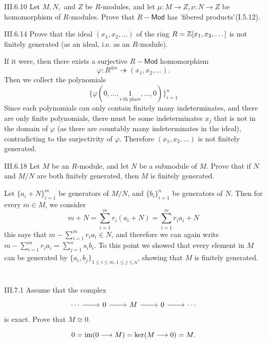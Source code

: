 \begin{problem}{III.6.10}
Let $M,N,$ and $Z$ be $R$-modules, and let $\mu:M \to Z, \nu:N \to Z$ be homomorphism of $R$-modules. Prove that $R-\mathsf{Mod}$ has 'fibered products'(I.5.12).
\end{problem}

\begin{problem}{III.6.14}
Prove that the ideal $(x_1,x_2,\dotsc)$ of the ring $R = \mathbb{Z}[x_1,x_2,\dotsc]$ is not finitely generated (as an ideal, i.e. as an $R$-module).
\end{problem}
\begin{pf}
If it were, then there exists a surjective $R-\mathsf{Mod}$ homomorphism
\[
\varphi : R^{\oplus n} \twoheadrightarrow (x_1,x_2,\dotsc).
\]
Then we collect the polynomials 
\[
\{\varphi(0,\dotsc,\underset{i\text{-th place}}{1},\dotsc,0)\}_{i = 1}^n	
\]
Since each polynomials can only contain finitely many indeterminates, and there are only finite polynomials, there must be some indeterminates $x_j$ that is not in the domain of $\varphi$ (as there are countably many indeterminates in the ideal), contradicting to the surjectivity of $\varphi$. Therefore $(x_1,x_2,\dotsc)$ is not finitely generated.
\end{pf}

\begin{problem}{III.6.18}
Let $M$ be an $R$-module, and let $N$ be a submodule of $M$. Prove that if $N$ and $M/N$ are both finitely generated, then $M$ is finitely generated.
\end{problem}
\begin{pf}
Let $\{a_i + N\}_{i = 1}^m$ be generators of $M/N$, and $\{b_i\}_{i = 1}^n$ be generators of $N$. Then for every $m \in M$, we consider
\[
m + N = \sum_{i=1}^m r_i (a_i + N) = \sum_{i=1}^m r_i a_i + N
\]
this says that $m - \sum_{i=1}^m r_i a_i \in N$, and therefore we can again write $m - \sum_{i=1}^m r_i a_i = \sum_{j=1}^n s_i b_i$. To this point we showed that every element in $M$ can be generated by $\{a_i,b_j\}_{1 \leq i \leq m, 1 \leq j \leq n}$, showing that $M$ is finitely generated.
\end{pf}

\section{}

\begin{problem}{III.7.1}
Assume that the complex
\[
\begin{tikzcd}
\cdots \arrow[r] &0 \arrow[r] &M \arrow[r] &0 \arrow[r] &\cdots 
\end{tikzcd}
\]
is exact. Prove that $M \cong 0$.
\end{problem}
\begin{pf}
\[
0 = \operatorname{im} (0 \longrightarrow M) = \ker (M \longrightarrow 0) = M.
\]
\end{pf}

